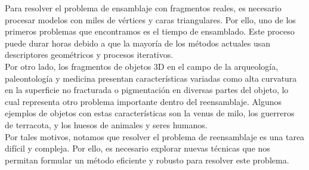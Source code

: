 
Para resolver el problema de ensamblaje con fragmentos reales, es necesario procesar modelos con miles de vértices y caras triangulares. Por ello, uno de los primeros problemas que encontramos es el tiempo de ensamblado. Este proceso puede durar horas debido a que la mayoría de los métodos actuales usan descriptores geométricos y procesos iterativos. \\

Por otro lado, los fragmentos de objetos 3D en el campo de la arqueología, paleontología y medicina presentan características variadas como alta curvatura en la superficie no fracturada o pigmentación en diversas partes del objeto, lo cual representa otro problema importante dentro del reensamblaje. Algunos ejemplos de objetos con estas características son la venus de milo, los guerreros de terracota, y los huesos de animales y seres humanos.  \\

Por tales motivos, notamos que resolver el problema de reensamblaje es una tarea difícil y compleja. Por ello, es necesario explorar nuevas técnicas que nos permitan formular un método eficiente y robusto para resolver este problema.